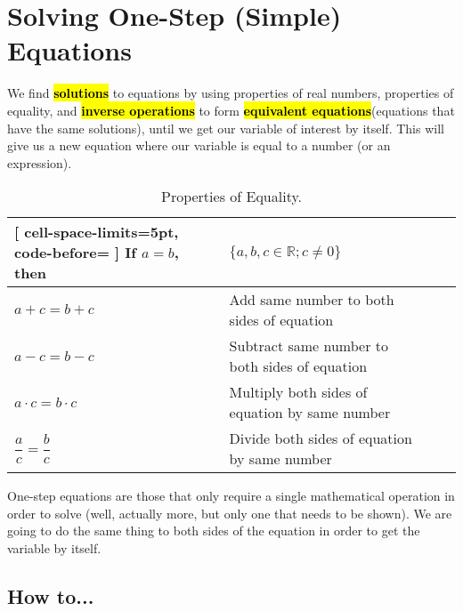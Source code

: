 \section{Solving One-Step (Simple) Equations}
We find \hl{\textbf{solutions}} to equations by using properties of real numbers, properties of equality, and \hl{\textbf{inverse operations}} to form \hl{\textbf{equivalent equations}}(equations that have the same solutions), until we get our variable of interest by itself. This will give us a new equation where our variable is equal to a number (or an expression). 

\begin{table}[H]
	\centering
	\caption{Properties of Equality.}
	\label{tab:Prop_of_Equal_Table}
	\begin{NiceTabular}{llll}[
			cell-space-limits=5pt, code-before= 
		]
		\toprule
		\RowStyle[bold=true]{}If $a=b$, then & $\{a,b,c \in \mathbb{R}; c\neq 0\}$\\
		\midrule
		$a+c=b+c$ & Add same number to both sides of equation \\
		$a-c=b-c$ & Subtract same number to both sides of equation \\
		$a\cdot c=b\cdot c$ & Multiply both sides of equation by same number \\
		$\dfrac{a}{c}=\dfrac{b}{c}$ & Divide both sides of equation by same number \\
		\midrule
	\end{NiceTabular}
\end{table}

One-step equations are those that only require a single mathematical operation in order to solve (well, actually more, but only one that needs to be shown). We are going to do the same thing to both sides of the equation in order to get the variable by itself.

\FloatBarrier

\subsection{How to...}


